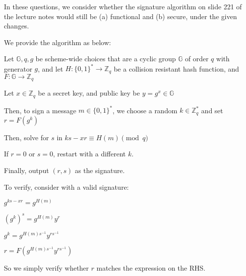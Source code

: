 



In these questions, we consider whether the signature algorithm on slide 221 of the lecture notes would still be (a) functional and (b) secure, under the given changes.

We provide the algorithm as below:

Let $\mathbb{G}, q ,g$ be scheme-wide choices that are a cyclic group $\mathbb{G}$ of order $q$ with generator $g$, and let $H : \{0,1\}^* \rightarrow \mathbb{Z}_q$ be a collision resistant hash function, and $F : \mathbb{G} \rightarrow \mathbb{Z}_q$

Let $x \in \mathbb{Z}_q$ be a secret key, and public key be $y = g^x \in \mathbb{G}$

Then, to sign a message $m \in \{0,1\}^*$, we choose a random $k \in \mathbb{Z}_q^*$ and set $r = F(g^k)$

Then, solve for $s$ in $ks - xr \equiv H(m) \pmod{q}$

If $r=0$ or $s=0$, restart with a different $k$.

Finally, output $(r,s)$ as the signature.

To verify, consider with a valid signature:

$g^{ks - xr} = g^{H(m)}$

$(g^k)^s = g^{H(m)}y^r$

$g^k = g^{H(m)s^{-1}}y^{rs^{-1}}$

$r = F(g^{H(m)s^{-1}}y^{rs^{-1}})$

So we simply verify whether $r$ matches the expression on the RHS.



